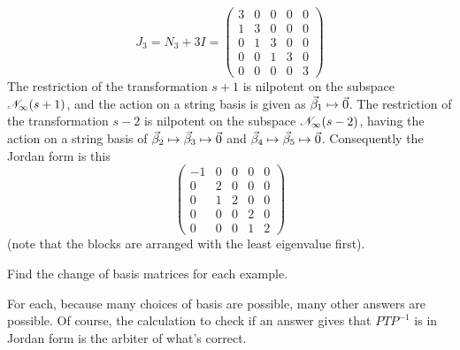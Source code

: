 \begin{exercises}
\begin{answer}
\begin{exparts}
          \begin{equation*}
           J_3=N_3+3I=
           \begin{pmatrix}
               3  &0  &0  &0  &0  \\
               1  &3  &0  &0  &0  \\
               0  &1  &3  &0  &0  \\
               0  &0  &1  &3  &0  \\
               0  &0  &0  &0  &3
             \end{pmatrix}
         \end{equation*} 
         \partsitem The restriction of the transformation $s+1$ is nilpotent
          on the subspace $\mathscr{N}_\infty(s+1)$, and the action on a 
          string basis is given as $\vec{\beta}_1\mapsto\vec{0}$.  
          The restriction of the transformation $s-2$ is nilpotent
          on the subspace $\mathscr{N}_\infty(s-2)$, having the action on a 
          string basis of $\vec{\beta}_2\mapsto\vec{\beta}_3\mapsto\vec{0}$
          and $\vec{\beta}_4\mapsto\vec{\beta}_5\mapsto\vec{0}$.        
          Consequently the Jordan form is this
          \begin{equation*}
            \begin{pmatrix}
              -1  &0  &0  &0  &0  \\
               0  &2  &0  &0  &0  \\
               0  &1  &2  &0  &0  \\
               0  &0  &0  &2  &0  \\
               0  &0  &0  &1  &2
             \end{pmatrix} 
          \end{equation*}
          (note that the blocks are arranged with the least eigenvalue first).
      \end{exparts}  
    \end{answer}
  \item 
    Find the change of basis matrices for each example. 
    \begin{exparts*}
      \partsitem {}
      \partsitem {}
      \partsitem {}
    \end{exparts*}
    \begin{answer}
      For each, because many choices of basis are possible, many other 
      answers are possible.
      Of course, the calculation to check if an answer gives that $PTP^{-1}$
      is in Jordan form is the arbiter of what's correct.

\end{answer}
\end{exercises}
